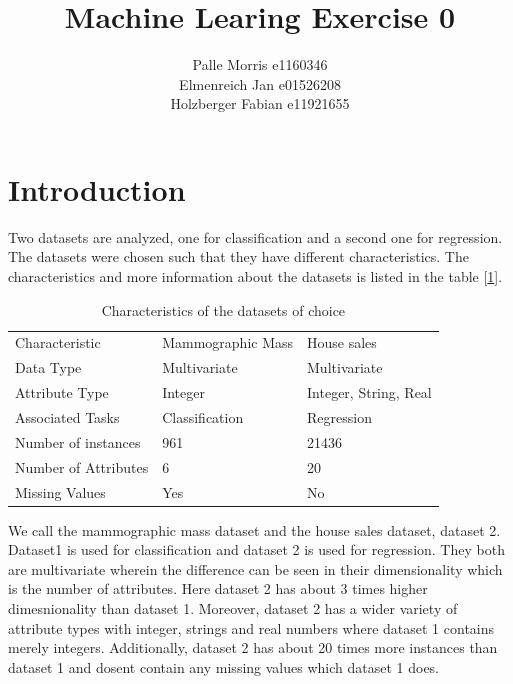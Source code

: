 \documentclass[11pt]{article}
\begin{document}
\graphicspath{{./figures/}}
\author{Palle Morris e1160346\\ Elmenreich Jan e01526208\\ Holzberger Fabian e11921655 }
\title{Machine Learing Exercise 0}
\maketitle



\section{Introduction}
Two datasets are analyzed, one for classification and a second one for regression. The datasets were chosen such that they have different characteristics. The characteristics and more information about the datasets is listed in the table [\ref{tab:char1}].
\begin{table}[H]
\begin{tabularx}{1.0\linewidth}{XXX}
\hline
Characteristic 		& Mammographic Mass 	& House sales   \\
Data Type 		& Multivariate 	& Multivariate \\
Attribute Type  	& Integer  & Integer, String, Real\\
Associated Tasks	& Classification & Regression \\
Number of instances     & 961 		 & 21436\\
Number of Attributes    & 6 		& 20\\
Missing Values 		& Yes 		& No \\
\hline
\end{tabularx}
\label{tab:char1}
\caption{Characteristics of the datasets of choice}
\end{table}

We call the mammographic mass dataset and the house sales dataset, dataset 2. Dataset1 is used for classification and dataset 2 is used for regression. They both are multivariate wherein the difference can be seen in their dimensionality which is the number of attributes. Here dataset 2 has about 3 times higher dimesnionality than dataset 1. Moreover, dataset 2 has a wider variety of attribute types with integer, strings and real numbers where dataset 1 contains merely integers. Additionally, dataset 2 has about 20 times more instances than dataset 1 and dosent contain any missing values which dataset 1 does.

\end{document}
